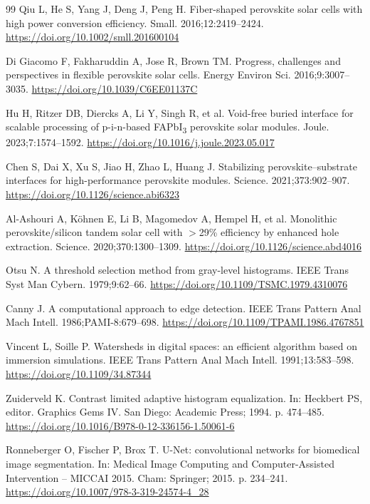 \documentclass[pdflatex,sn-mathphys-num,iicol]{sn-jnl}
\theoremstyle{thmstyleone}
\theoremstyle{thmstyletwo}
\theoremstyle{thmstylethree}
\begin{document}
\begin{thebibliography}{99}
Qiu L, He S, Yang J, Deng J, Peng H.
Fiber-shaped perovskite solar cells with high power conversion efficiency.
Small. 2016;12:2419--2424.
\url{https://doi.org/10.1002/smll.201600104}

Di Giacomo F, Fakharuddin A, Jose R, Brown TM.
Progress, challenges and perspectives in flexible perovskite solar cells.
Energy Environ Sci. 2016;9:3007--3035.
\url{https://doi.org/10.1039/C6EE01137C}

Hu H, Ritzer DB, Diercks A, Li Y, Singh R, et al.
Void-free buried interface for scalable processing of p-i-n-based
FAPbI\textsubscript{3} perovskite solar modules.
Joule. 2023;7:1574--1592.
\url{https://doi.org/10.1016/j.joule.2023.05.017}

Chen S, Dai X, Xu S, Jiao H, Zhao L, Huang J.
Stabilizing perovskite--substrate interfaces for high-performance
perovskite modules.
Science. 2021;373:902--907.
\url{https://doi.org/10.1126/science.abi6323}

Al-Ashouri A, K\"{o}hnen E, Li B, Magomedov A, Hempel H, et al.
Monolithic perovskite/silicon tandem solar cell with $>$29\% efficiency
by enhanced hole extraction.
Science. 2020;370:1300--1309.
\url{https://doi.org/10.1126/science.abd4016}

Otsu N.
A threshold selection method from gray-level histograms.
IEEE Trans Syst Man Cybern. 1979;9:62--66.
\url{https://doi.org/10.1109/TSMC.1979.4310076}

Canny J.
A computational approach to edge detection.
IEEE Trans Pattern Anal Mach Intell. 1986;PAMI-8:679--698.
\url{https://doi.org/10.1109/TPAMI.1986.4767851}

Vincent L, Soille P.
Watersheds in digital spaces: an efficient algorithm based on
immersion simulations.
IEEE Trans Pattern Anal Mach Intell. 1991;13:583--598.
\url{https://doi.org/10.1109/34.87344}

Zuiderveld K.
Contrast limited adaptive histogram equalization.
In: Heckbert PS, editor. Graphics Gems IV.
San Diego: Academic Press; 1994. p. 474--485.
\url{https://doi.org/10.1016/B978-0-12-336156-1.50061-6}

Ronneberger O, Fischer P, Brox T.
U-Net: convolutional networks for biomedical image segmentation.
In: Medical Image Computing and Computer-Assisted Intervention --
MICCAI 2015.
Cham: Springer; 2015. p. 234--241.
\url{https://doi.org/10.1007/978-3-319-24574-4_28}


\end{thebibliography}
\end{document}
